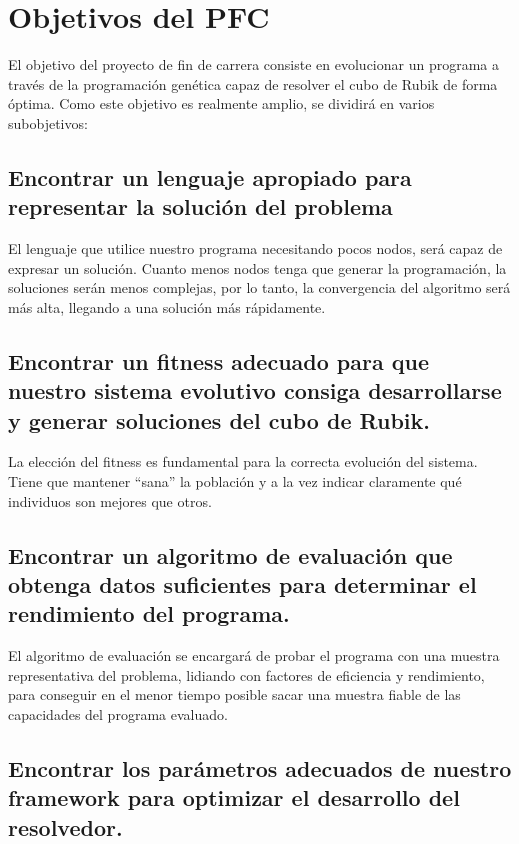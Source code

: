 \chapter{Objetivos del PFC}\label{ch:objetivos}

El objetivo del proyecto de fin de carrera consiste en evolucionar un programa a
través de la programación genética capaz de resolver el cubo de Rubik de forma
óptima. Como este objetivo es realmente amplio, se dividirá en varios
subobjetivos:

\section{Encontrar un lenguaje apropiado para representar la solución del
problema}

El lenguaje que utilice nuestro programa necesitando pocos nodos, será capaz  de
expresar un solución. Cuanto menos nodos tenga que generar la programación, la
soluciones serán menos complejas, por lo tanto, la convergencia del algoritmo
será más alta, llegando a una solución más rápidamente.

\section{Encontrar un fitness adecuado para que nuestro sistema evolutivo
consiga desarrollarse y generar soluciones del cubo de Rubik.}

La elección del fitness es fundamental para la correcta evolución del sistema.
Tiene que mantener “sana” la población y a la vez indicar claramente qué
individuos son mejores que otros.

\section{Encontrar un algoritmo de evaluación que obtenga datos
suficientes para determinar el rendimiento del programa.}

El algoritmo de evaluación se encargará de probar el programa con una muestra
representativa del problema, lidiando con factores de eficiencia y rendimiento,
para conseguir en el menor tiempo posible sacar una muestra fiable de las
capacidades del programa evaluado.

\section{Encontrar los parámetros adecuados de nuestro framework para optimizar el
desarrollo del resolvedor.}

